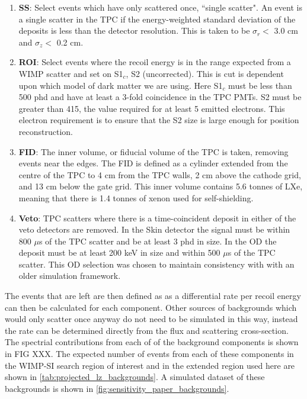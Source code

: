 \begin{enumerate}
    \item \textbf{SS}: Select events which have only scattered once, ``single scatter". An event is a single scatter in the TPC if the energy-weighted standard deviation of the deposits is less than the detector resolution. This is taken to be $\sigma_r <$ 3.0 cm and $\sigma_z <$ 0.2 cm.
    \item \textbf{ROI}: Select events where the recoil energy is in the range expected from a WIMP scatter and set on S1$_c$, S2 (uncorrected). This is cut is dependent upon which model of dark matter we are using. Here S1$_c$ must be less than 500 phd and have at least a 3-fold coincidence in the TPC PMTs. S2 must be greater than 415, the value required for at least 5 emitted electrons. This electron requirement is to ensure that the S2 size is large enough for position reconstruction.
    \item \textbf{FID}: The inner volume, or fiducial volume of the TPC is taken, removing events near the edges. The FID is defined as a cylinder extended from the centre of the TPC to 4 cm from the TPC walls, 2 cm above the cathode grid, and 13 cm below the gate grid. This inner volume contains 5.6 tonnes of LXe, meaning that there is 1.4 tonnes of xenon used for self-shielding.
    \item \textbf{Veto}: TPC scatters where there is a time-coincident deposit in either of the veto detectors are removed. In the Skin detector the signal must be within 800 $\mu$s of the TPC scatter and be at least 3 phd in size. In the OD the deposit must be at least 200 keV in size and within 500 $\mu$s of the TPC scatter. This OD selection was chosen to maintain consistency with \cite{LZ_projected_sensitivity_paper_ref} with an older simulation framework.
\end{enumerate}
The events that are left are then defined as as a differential rate per recoil energy can then be calculated for each component.
Other sources of backgrounds which would only scatter once anyway do not need to be simulated in this way, instead the rate can be determined directly from the flux and scattering cross-section.
The spectrial contributions from each of of the background components is shown in FIG XXX.
The expected number of events from each of these components in the WIMP-SI search region of interest and in the extended region used here are shown in 
\autoref{tab:projected_lz_backgrounds}.
A simulated dataset of these backgrounds is shown in  \autoref{fig:sensitivity_paper_backgrounds}.

